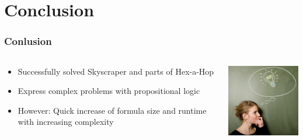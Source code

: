 \section{Conclusion}

\begin{frame}
	\frametitle{Conlusion}
	\begin{columns}
		\begin{column}{6cm}
			\begin{itemize}
				\item Successfully solved Skyscraper and parts of Hex-a-Hop
				\item<2-> Express complex problems with propositional logic
				\item<3-> However: Quick increase of formula size and runtime with increasing complexity
			\end{itemize}
		\end{column}
		\begin{column}{5cm}
			\centering
			\includegraphics[width=4.5cm]{images/bulb.jpg}
		\end{column}
	\end{columns}

\end{frame}
